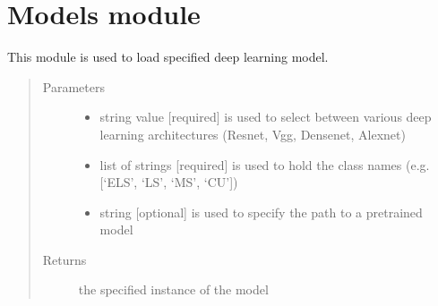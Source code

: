 \documentclass[letterpaper,10pt,english,openany,oneside]{sphinxmanual}
\begin{document}
\section{Models \sphinxhyphen{} module}
\label{\detokenize{Models:module-stc.Models}}\label{\detokenize{Models:models-module}}\label{\detokenize{Models::doc}}

\begin{fulllineitems}
\label{\detokenize{Models:stc.Models.loadModel}}
This module is used to load specified deep learning model.
\begin{quote}\begin{description}
\item[{Parameters}] \leavevmode\begin{itemize}
\item {} 
 \textendash{} string value {[}required{]} \sphinxhyphen{} is used to select between various deep learning architectures
(Resnet, Vgg, Densenet, Alexnet)

\item {} 
 \textendash{} list of strings {[}required{]} \sphinxhyphen{} is used to hold the class names (e.g. {[}‘ELS’, ‘LS’, ‘MS’, ‘CU’{]})

\item {} 
 \textendash{} string {[}optional{]} \sphinxhyphen{} is used to specify the path to a pre\sphinxhyphen{}trained model

\end{itemize}

\item[{Returns}] \leavevmode
the specified instance of the model

\end{description}\end{quote}

\end{fulllineitems}
\end{document}
